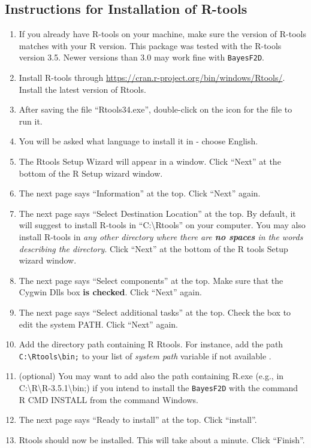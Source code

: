 \documentclass{article}
\begin{document}
\subsection{\Large Instructions for Installation of R-tools }
\label{sec:Rtools}
\begin{enumerate}
\item If you already have R-tools on your machine, make sure the version of R-tools matches with your R version. This package was tested with the R-tools version 3.5. Newer versions than 3.0 may work fine with \texttt{BayesF2D}.
\item Install R-tools through \url{https://cran.r-project.org/bin/windows/Rtools/}. Install the latest version of Rtools.
\item After saving the file ``Rtools34.exe'', double-click on the icon for the file to run it.
\item You will be asked what language to install it in - choose English.
\item The Rtools Setup Wizard will appear in a window. Click ``Next'' at the bottom of the R Setup wizard window.
\item The next page says ``Information'' at the top. Click ``Next'' again.
\item The next page says ``Select Destination Location'' at the top. By default, it will suggest to install R-tools in ``C:\textbackslash Rtools'' on your computer. You may also install R-tools in  {\em any other directory where there are {\bf no spaces} in the words describing the directory}. Click ``Next'' at the bottom of the R tools Setup wizard window.
\item The next page says ``Select components'' at the top. Make sure that the Cygwin Dlls box {\bf is checked}. Click ``Next'' again.
\item The next page says ``Select additional tasks'' at the top. Check the box to edit the system PATH. Click ``Next'' again.
\item Add the directory path containing  R Rtools. For instance,  add the path \texttt{C:\textbackslash Rtools\textbackslash bin;}  to your list of {\em system path} variable if not available .\\
\item (optional) You may want to add also the path containing R.exe (e.g., in C:\textbackslash R\textbackslash R-3.5.1\textbackslash bin;) if you intend to install the \texttt{BayesF2D} with the command R CMD INSTALL from the command Windows.
\item The next page says ``Ready to install'' at the top. Click ``install''.
\item Rtools should now be installed. This will take about a minute. Click ``Finish''.
\end{enumerate}
\end{document}
